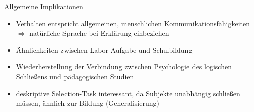 \begin{frame}{Allgemeine Implikationen {\scriptsize \cite[S.~115]{stenningHumanReasoningCognitive2008}}}
    \begin{itemize}
        \item Verhalten entspricht allgemeinen, menschlichen Kommunikationsfähigkeiten \\
            $\Rightarrow$ \alert{natürliche Sprache} bei Erklärung einbeziehen
        \item Ähnlichkeiten zwischen Labor-Aufgabe und \alert{Schulbildung}
        \item Wiederherstellung der Verbindung zwischen Psychologie des logischen Schließens und pädagogischen Studien
        \item deskriptive Selection-Task interessant, da Subjekte unabhängig schließen müssen, ähnlich zur Bildung (Generalisierung)
    \end{itemize}
\end{frame}
